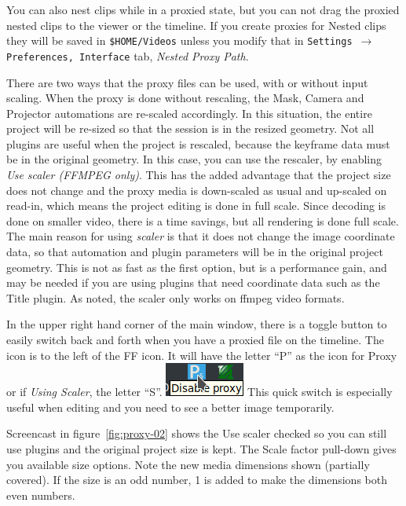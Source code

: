 You can also nest clips while in a proxied state, but you can not drag the proxied nested clips
to the viewer or the timeline.
If you create proxies for Nested clips they will be saved in \texttt{\$HOME/Videos} unless you modify that in
\texttt{Settings $\rightarrow$ Preferences, Interface} tab, \textit{Nested Proxy Path}. 

There are two ways that the proxy files can be used, with or without input scaling. When the proxy is done without rescaling, the Mask, Camera and Projector automations are re-scaled accordingly. In this situation, the entire project will be re-sized so that the session is in the resized geometry.  Not all plugins are useful when the project is rescaled, because the keyframe data must be in the original geometry.  In this case, you can use the rescaler, by enabling \textit{Use scaler (FFMPEG only)}. This has the added advantage that the project size does not change and the proxy media is down-scaled as usual and up-scaled on read-in, which means the project editing is done in full scale.   Since decoding is done on smaller video, there is a time savings, but all rendering is done full scale.  The main reason for using \textit{scaler} is that it does not change the image coordinate data, so that automation and plugin parameters will be in the original project geometry.   This is not as fast as the first option, but is a performance gain, and may be needed if you are using plugins that need coordinate data such as the Title plugin.  As noted, the scaler only works on ffmpeg video formats.

In the upper right hand corner of the main window, there is a toggle button to easily switch back and forth when you have a proxied file on the timeline.  The icon is to the left of the FF icon.  It will have the letter “P” as the icon for Proxy or if \textit{Using Scaler}, the letter “S”. \quad \includegraphics[height=\baselineskip]{images/proxy-01.png} \quad This quick switch is especially useful when editing and you need to see a better image temporarily.

Screencast in figure~\ref{fig:proxy-02} shows the Use scaler checked so you can still use plugins and the original project size is kept.  The Scale factor pull-down gives you available size options.  Note the new media dimensions shown (partially covered).  If the size is an odd number, 1 is added to make the dimensions both even numbers.

